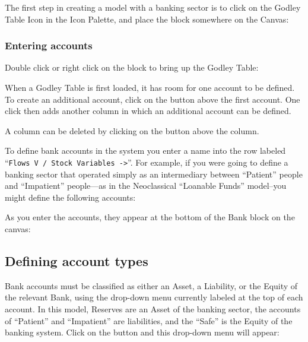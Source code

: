 The first step in creating a model with a banking sector is to click on the Godley Table Icon in the Icon Palette, and place the block somewhere on the Canvas:


\subsubsection{Entering accounts}

Double click or right click on the  block
to bring up the Godley Table:


When a Godley Table is first loaded, it has room for one account to be
defined. To create an additional account, click on the
 button above the first account. One
click then adds another column in which an additional account can be
defined.



A column can be deleted by clicking on the  button above the column.

To define bank accounts in the system you enter a name into the row
labeled ``\verb+Flows V / Stock Variables ->+''. For example, if you were
going to define a banking sector that operated simply as an
intermediary between ``Patient'' people and ``Impatient'' people---as
in the Neoclassical ``Loanable Funds'' model--you might define the
following accounts: 


As you enter the accounts, they appear at the bottom of the Bank block on the canvas:


\subsection{Defining account types}

Bank accounts must be classified as either an Asset, a Liability, or
the Equity of the relevant Bank, using the drop-down menu currently
labeled  at the top of each account. In
this model, Reserves are an Asset of the banking sector, the accounts
of ``Patient'' and ``Impatient'' are liabilities, and the ``Safe'' is
the Equity of the banking system. Click on the
 button and this drop-down menu will
appear:


